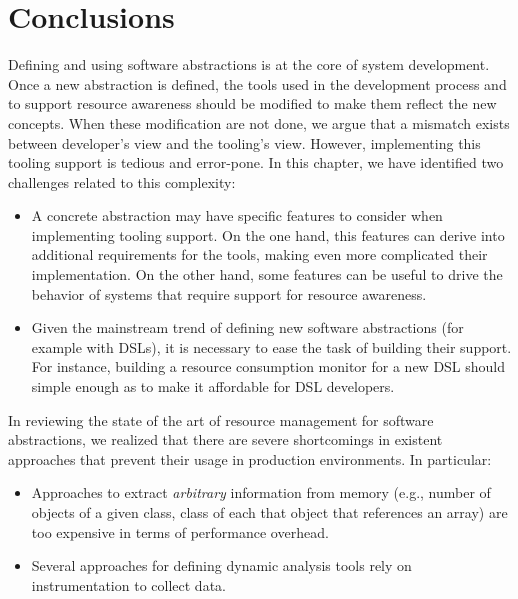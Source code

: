 \section{Conclusions}


Defining and using software abstractions is at the core of system development.
Once a new abstraction is defined, the tools used in the development process and to support resource awareness should be modified to make them reflect the new concepts.
When these modification are not done, we argue that a mismatch exists between developer's view and the tooling's view.
However, implementing this tooling support is tedious and error-pone.
In this chapter, we have identified two challenges related to this complexity:

\begin{itemize}
\item A concrete abstraction may have specific features to consider when implementing tooling support.
On the one hand, this features can derive into additional requirements for the tools, making even more complicated their implementation.
On the other hand, some features can be useful to drive the behavior of systems that require support for resource awareness.

\item Given the mainstream trend of defining new software abstractions (for example with DSLs), it is necessary to ease the task of building their support.
For instance, building a resource consumption monitor for a new DSL should simple enough as to make it affordable for DSL developers.
\end{itemize}   

In reviewing the state of the art of resource management for software abstractions, we realized that there are severe shortcomings in existent approaches that prevent their usage in production environments. In particular:

\begin{itemize}
\item Approaches to extract \textit{arbitrary} information from memory (e.g., number of objects of a given class, class of each that object that references an array) are too expensive in terms of performance overhead.

\item Several approaches for defining dynamic analysis tools rely on instrumentation to collect data. 
\end{itemize} 

%


